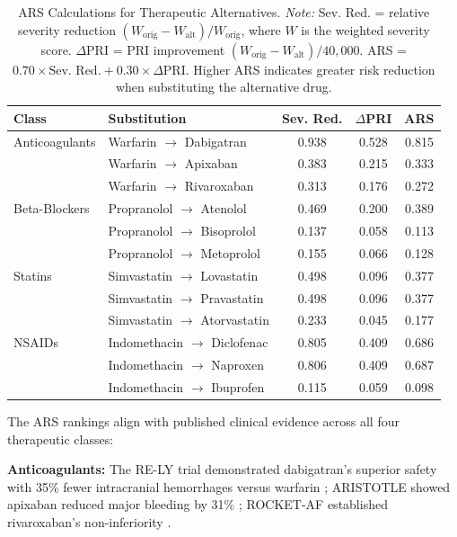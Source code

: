 \documentclass[11pt,a4paper]{article}
\begin{document}
\begin{table}[H]
\centering
\caption[ARS Calculations for Therapeutic Alternatives]{ARS Calculations for Therapeutic Alternatives. \textit{Note:} Sev. Red. = relative severity reduction $(W_{\text{orig}} - W_{\text{alt}})/W_{\text{orig}}$, where $W$ is the weighted severity score. $\Delta$PRI = PRI improvement $(W_{\text{orig}} - W_{\text{alt}})/40{,}000$. ARS = $0.70 \times \text{Sev. Red.} + 0.30 \times \Delta\text{PRI}$. Higher ARS indicates greater risk reduction when substituting the alternative drug.}
\label{tab:ars_all}
\begin{tabular}{llccc}
\toprule
\textbf{Class} & \textbf{Substitution} & \textbf{Sev. Red.} & \textbf{$\Delta$PRI} & \textbf{ARS} \\
\midrule
Anticoagulants & Warfarin $\rightarrow$ Dabigatran & 0.938 & 0.528 & 0.815 \\
& Warfarin $\rightarrow$ Apixaban & 0.383 & 0.215 & 0.333 \\
& Warfarin $\rightarrow$ Rivaroxaban & 0.313 & 0.176 & 0.272 \\
\midrule
Beta-Blockers & Propranolol $\rightarrow$ Atenolol & 0.469 & 0.200 & 0.389 \\
& Propranolol $\rightarrow$ Bisoprolol & 0.137 & 0.058 & 0.113 \\
& Propranolol $\rightarrow$ Metoprolol & 0.155 & 0.066 & 0.128 \\
\midrule
Statins & Simvastatin $\rightarrow$ Lovastatin & 0.498 & 0.096 & 0.377 \\
& Simvastatin $\rightarrow$ Pravastatin & 0.498 & 0.096 & 0.377 \\
& Simvastatin $\rightarrow$ Atorvastatin & 0.233 & 0.045 & 0.177 \\
\midrule
NSAIDs & Indomethacin $\rightarrow$ Diclofenac & 0.805 & 0.409 & 0.686 \\
& Indomethacin $\rightarrow$ Naproxen & 0.806 & 0.409 & 0.687 \\
& Indomethacin $\rightarrow$ Ibuprofen & 0.115 & 0.059 & 0.098 \\
\bottomrule
\end{tabular}
\end{table}

The ARS rankings align with published clinical evidence across all four therapeutic classes:

\textbf{Anticoagulants:} The RE-LY trial demonstrated dabigatran's superior safety with 35\% fewer intracranial hemorrhages versus warfarin \cite{connolly2009rely}; ARISTOTLE showed apixaban reduced major bleeding by 31\% \cite{granger2011aristotle}; ROCKET-AF established rivaroxaban's non-inferiority \cite{patel2011rocketaf}.
\end{document}

